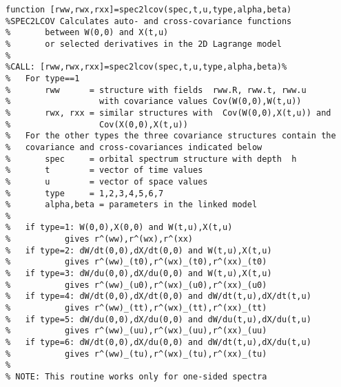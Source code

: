 {\begin{verbatim}
function [rww,rwx,rxx]=spec2lcov(spec,t,u,type,alpha,beta)
%SPEC2LCOV Calculates auto- and cross-covariance functions 
%       between W(0,0) and X(t,u) 
%       or selected derivatives in the 2D Lagrange model 
%
%CALL: [rww,rwx,rxx]=spec2lcov(spec,t,u,type,alpha,beta)%
%   For type==1
%       rww      = structure with fields  rww.R, rww.t, rww.u
%                  with covariance values Cov(W(0,0),W(t,u))
%       rwx, rxx = similar structures with  Cov(W(0,0),X(t,u)) and 
%                  Cov(X(0,0),X(t,u))
%   For the other types the three covariance structures contain the
%   covariance and cross-covariances indicated below
%       spec     = orbital spectrum structure with depth  h
%       t        = vector of time values
%       u        = vector of space values
%       type     = 1,2,3,4,5,6,7
%       alpha,beta = parameters in the linked model 
%
%   if type=1: W(0,0),X(0,0) and W(t,u),X(t,u) 
%           gives r^(ww),r^(wx),r^(xx)
%   if type=2: dW/dt(0,0),dX/dt(0,0) and W(t,u),X(t,u) 
%           gives r^(ww)_(t0),r^(wx)_(t0),r^(xx)_(t0)
%   if type=3: dW/du(0,0),dX/du(0,0) and W(t,u),X(t,u) 
%           gives r^(ww)_(u0),r^(wx)_(u0),r^(xx)_(u0)
%   if type=4: dW/dt(0,0),dX/dt(0,0) and dW/dt(t,u),dX/dt(t,u) 
%           gives r^(ww)_(tt),r^(wx)_(tt),r^(xx)_(tt)
%   if type=5: dW/du(0,0),dX/du(0,0) and dW/du(t,u),dX/du(t,u) 
%           gives r^(ww)_(uu),r^(wx)_(uu),r^(xx)_(uu)
%   if type=6: dW/dt(0,0),dX/du(0,0) and dW/dt(t,u),dX/du(t,u) 
%           gives r^(ww)_(tu),r^(wx)_(tu),r^(xx)_(tu)
%
% NOTE: This routine works only for one-sided spectra
\end{verbatim}
\clearpage

}
